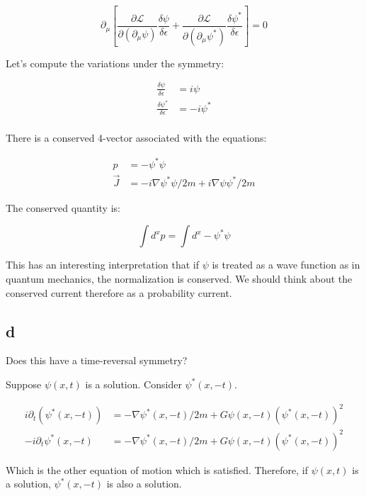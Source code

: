\documentclass{article}
\newcommand{\Lagr}[0]{\mathcal{L}}
\begin{document}
\[ \partial_\mu \left[ \frac{\partial \Lagr}{\partial( \partial_\mu \psi)}
	\frac{\delta \psi}{\delta \epsilon} 
	+ \frac{\partial \Lagr}{\partial( \partial_\mu \psi^*)}
	\frac{\delta \psi^*}{\delta \epsilon} \right] = 0 \]

Let's compute the variations under the symmetry:

\begin{align*}
\frac{\delta \psi}{\delta \epsilon} & = i \psi\\ 
\frac{\delta \psi^*}{\delta \epsilon} & = -i \psi^*\\
\end{align*}

There is a conserved 4-vector associated with the equations:

\begin{align*}
p & = - \psi^* \psi \\
\vec{J} & = - i \nabla \psi^* \psi/2m + i \nabla \psi \psi^* / 2m 
\end{align*}

The conserved quantity is:

\[ \int d^x p = \int d^x - \psi^* \psi \]

This has an interesting interpretation that if $\psi$ is treated as a wave function
	as in quantum mechanics, the normalization is conserved.
We should think about the conserved current therefore as a probability current.

\subsection{d}

Does this have a time-reversal symmetry?

Suppose $\psi(x, t)$ is a solution.
Consider $\psi^*(x, -t)$.

\begin{align*}
i \partial_t ( \psi^*(x, -t)) & = - \nabla \psi^*(x, -t)/2m + G \psi(x, -t)(\psi^*(x, -t))^2 \\
- i \partial_t \psi^*(x, -t) & = - \nabla \psi^*(x, -t)/2m + G \psi(x, -t)(\psi^*(x, -t))^2
\end{align*}

Which is the other equation of motion which is satisfied.
Therefore, if $\psi(x,t)$ is a solution, $\psi^*(x, -t)$ is also a solution.
\end{document}
